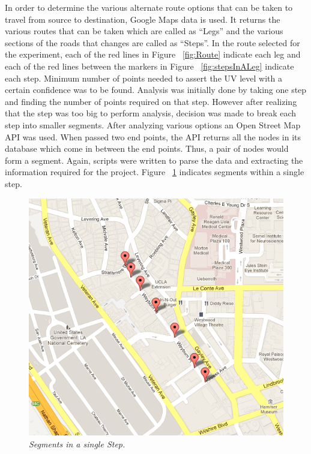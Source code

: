 \documentclass[10pt]{sigplan-proc-varsize}
\begin{document}
In order to determine the various alternate route options that can be taken to travel from source to destination, Google Maps \cite{googleMapsOriginal} data is used. It returns the various routes that can be taken which are called as “Legs” and the various sections of the roads that changes are called as “Steps”. In the route selected for the experiment, each of the red lines in Figure ~\ref{fig:Route} indicate each leg and each of the red lines between the markers in Figure ~\ref{fig:stepsInALeg} indicate each step. Minimum number of points needed to assert the UV level with a certain confidence was to be found. Analysis was initially done by taking one step and finding the number of points required on that step. However after realizing that the step was too big to perform analysis, decision was made to break each step into smaller segments. After analyzing various options an Open Street Map API  \cite{openStreetMapsDirections} was used. When passed two end points, the API returns all the nodes in its database which come in between the end points. Thus, a pair of nodes would form a segment. Again, scripts were written to parse the data and extracting the information required for the project. Figure ~\ref{fig:segmentsInAStep} indicates segments within a single step. 


\begin{figure}
\begin{center}
\includegraphics[scale=0.35]{segmentsInAStep.png}
\caption{\small \sl Segments in a single Step.\label{fig:segmentsInAStep}}
\end{center}
\end{figure}
\end{document}

